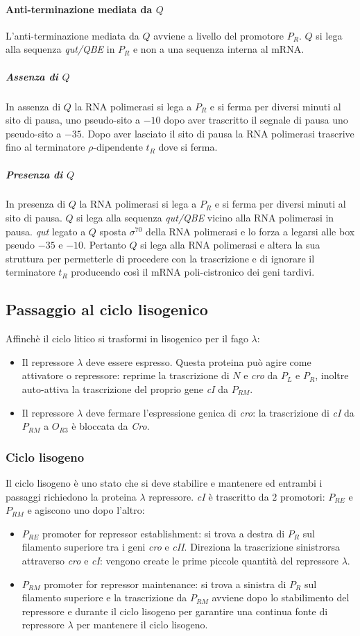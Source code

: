 \paragraph{Anti-terminazione mediata da $Q$}
L'anti-terminazione mediata da $Q$ avviene a livello del promotore $P_R$. $Q$ si lega alla sequenza \emph{qut/QBE} in $P_R$ e non a una sequenza interna al mRNA.
\subparagraph{Assenza di $Q$}
In assenza di $Q$ la RNA polimerasi si lega a $P_R$ e si ferma per diversi minuti al sito di pausa, uno pseudo-sito a $-10$ dopo aver trascritto il segnale di pausa uno pseudo-sito a 
$-35$. Dopo aver lasciato il sito di pausa la RNA polimerasi trascrive fino al terminatore $\rho$-dipendente $t_R$ dove si ferma.
\subparagraph{Presenza di $Q$}
In presenza di $Q$ la RNA polimerasi si lega a $P_R$ e si ferma per diversi minuti al sito di pausa. $Q$ si lega alla sequenza \emph{qut/QBE} vicino alla RNA polimerasi in pausa. 
\emph{qut} legato a $Q$ sposta $\sigma^{70}$ della RNA polimerasi e lo forza a legarsi alle box pseudo $-35$ e $-10$. Pertanto $Q$ si lega alla RNA polimerasi e altera la sua struttura
per permetterle di procedere con la trascrizione e di ignorare il terminatore $t_R$ producendo cos\`i il mRNA poli-cistronico dei geni tardivi. 
\subsection{Passaggio al ciclo lisogenico}
Affinch\`e il ciclo litico si trasformi in lisogenico per il fago $\lambda$:
\begin{itemize}
	\item Il repressore $\lambda$ deve essere espresso. Questa proteina pu\`o agire come attivatore o repressore: reprime la trascrizione di $N$ e \emph{cro}  da $P_L$ e $P_R$, 
		inoltre auto-attiva la trascrizione del proprio gene \emph{cI} da $P_{RM}$. 
	\item Il repressore $\lambda$ deve fermare l'espressione genica di \emph{cro}: la trascrizione di \emph{cI} da $P_{RM}$ a $O_{R3}$ \`e bloccata da \emph{Cro}. 
\end{itemize}
\subsubsection{Ciclo lisogeno}
Il ciclo lisogeno \`e uno stato che si deve stabilire e mantenere ed entrambi i passaggi richiedono la proteina $\lambda$ repressore. \emph{cI} \`e trascritto da $2$ promotori: 
$P_{RE}$ e $P_{RM}$ e agiscono uno dopo l'altro:
\begin{itemize}
	\item $P_{RE}$ promoter for repressor establishment: si trova a destra di $P_R$ sul filamento superiore tra i geni \emph{cro} e \emph{cII}. Direziona la trascrizione sinistrorsa
		attraverso \emph{cro} e \emph{cI}: vengono create le prime piccole quantit\`a del repressore $\lambda$.
	\item $P_{RM}$ promoter for repressor maintenance: si trova a sinistra di $P_R$ sul filamento superiore e la trascrizione da $P_{RM}$ avviene dopo lo stabilimento del repressore
		e durante il ciclo lisogeno per garantire una continua fonte di repressore $\lambda$ per mantenere il ciclo lisogeno.
\end{itemize}
